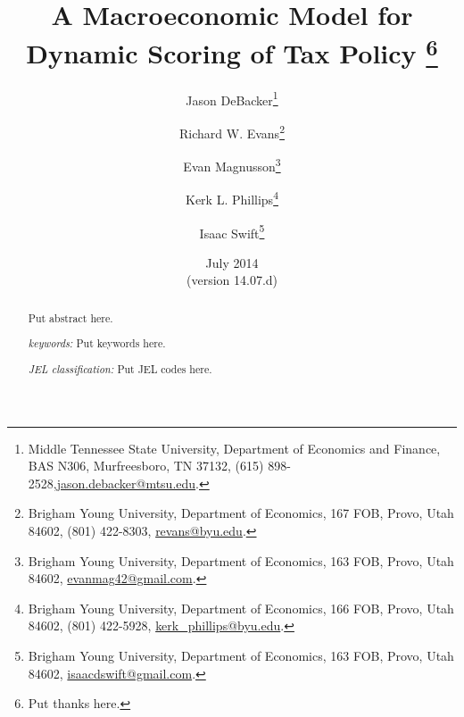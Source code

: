 \documentclass[letterpaper,12pt]{article}
\theoremstyle{definition}
\begin{document}
\begin{titlepage}
\title{A Macroeconomic Model for \\
       Dynamic Scoring of Tax Policy
       \thanks{
       Put thanks here.}
       }
\author{
  Jason DeBacker\footnote{Middle Tennessee State University, Department of Economics and Finance, BAS N306, Murfreesboro, TN 37132, (615) 898-2528,\href{mailto:jason.debacker@mtsu.edu}{jason.debacker@mtsu.edu}.} \\[-2pt]
  \and
  Richard W. Evans\footnote{Brigham Young University, Department of Economics, 167 FOB, Provo, Utah 84602, (801) 422-8303, \href{mailto:revans@byu.edu}{revans@byu.edu}.} \\[-2pt]
  \and
  Evan Magnusson\footnote{Brigham Young University, Department of Economics, 163 FOB, Provo, Utah 84602, \href{mailto:evanmag42@gmail.com}{evanmag42@gmail.com}.} \\[-2pt]
  \and
  Kerk L. Phillips\footnote{Brigham Young University, Department of Economics, 166 FOB, Provo, Utah 84602, (801) 422-5928, \href{mailto:kerk_phillips@byu.edu}{kerk\_phillips@byu.edu}.} \\[-2pt]
  \and
  Isaac Swift\footnote{Brigham Young University, Department of Economics, 163 FOB, Provo, Utah 84602, \href{mailto:isaacdswift@gmail.com}{isaacdswift@gmail.com}.} \\[-2pt]}
\date{July 2014 \\
  \scriptsize{(version 14.07.d)}}
\maketitle
\begin{abstract}
\normalsize{Put abstract here.

\vspace{3mm}

\noindent\textit{keywords:}\: Put keywords here.

\vspace{3mm}

\noindent\textit{JEL classification:} Put JEL codes here.}
\end{abstract}
\thispagestyle{empty}
\end{titlepage}
\end{document}
